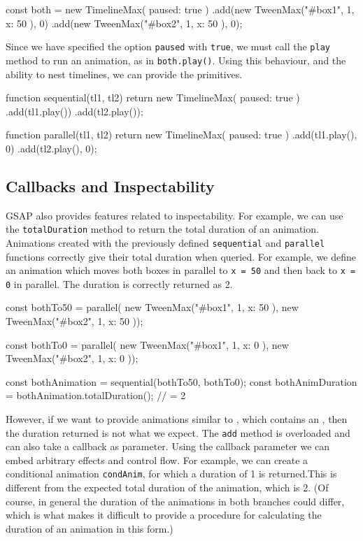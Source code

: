 \begin{js}
const both = new TimelineMax({ paused: true })
  .add(new TweenMax("#box1", 1, { x: 50 }), 0)
  .add(new TweenMax("#box2", 1, { x: 50 }), 0);
\end{js}

Since we have specified the option \texttt{paused} with \texttt{true}, we must
call the \texttt{play} method to run an animation, as in
\texttt{both.play()}. Using this behaviour, and the ability to nest timelines,
we can provide the \dsl{} primitives.

\begin{js}
function sequential(tl1, tl2) {
  return new TimelineMax({ paused: true })
    .add(tl1.play())
    .add(tl2.play()); }

function parallel(tl1, tl2) {
  return new TimelineMax({ paused: true })
    .add(tl1.play(), 0)
    .add(tl2.play(), 0); }
\end{js}

\subsection{Callbacks and Inspectability}

GSAP also provides features related to inspectability. For example, we can use the
\texttt{totalDuration} method to return the total duration of an animation.
Animations created with the previously defined \texttt{sequential} and
\texttt{parallel} functions correctly give their total duration when queried.
For example, we define an animation which moves both boxes in parallel to
\texttt{x = 50} and then back to \texttt{x = 0} in parallel. The duration is
correctly returned as 2.

\begin{js}
const bothTo50 = parallel(
  new TweenMax("#box1", 1, { x: 50 }),
  new TweenMax("#box2", 1, { x: 50 }));

const bothTo0 = parallel(
  new TweenMax("#box1", 1, { x: 0 }),
  new TweenMax("#box2", 1, { x: 0 }));

const bothAnimation = sequential(bothTo50, bothTo0);
const bothAnimDuration = bothAnimation.totalDuration(); // = 2
\end{js}

However, if we want to provide animations similar to , which contains an , then the duration returned is not what we expect. The \texttt{add} method is overloaded and can also take a callback as parameter. Using the callback parameter we can embed arbitrary effects and control flow. For example, we can create a conditional animation \texttt{condAnim}, for which a duration of 1 is returned.This is different from the expected total duration of the animation, which is 2. (Of course, in general the duration of the animations in both branches could differ, which is what makes it difficult to provide a procedure for calculating the duration of an animation in this form.)

